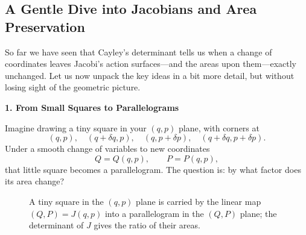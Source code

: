 \subsection{A Gentle Dive into Jacobians and Area Preservation}

So far we have seen that Cayley’s determinant tells us when a change of coordinates leaves Jacobi’s action surfaces—and the areas upon them—exactly unchanged.  Let us now unpack the key ideas in a bit more detail, but without losing sight of the geometric picture.

\textbf{1. From Small Squares to Parallelograms}

Imagine drawing a tiny square in your \((q,p)\) plane, with corners at
\[
(q,p),\quad (q+\delta q,p),\quad (q,p+\delta p),\quad (q+\delta q,p+\delta p).
\]
Under a smooth change of variables to new coordinates
\[
Q = Q(q,p),\qquad P = P(q,p),
\]
that little square becomes a parallelogram.  The question is: by what factor does its area change?


\begin{figure}[H]
    \centering
    \caption{A tiny square in the $(q,p)$ plane is carried by the linear map $(Q,P)=J(q,p)$ into a parallelogram in the $(Q,P)$ plane; the determinant of $J$ gives the ratio of their areas.}
\end{figure}








